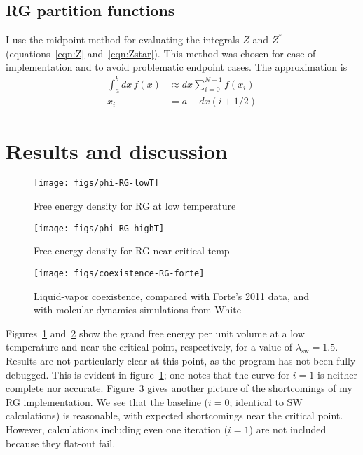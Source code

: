 \documentclass[letterpaper,twocolumn,amsmath,amssymb,prb]{revtex4-1}
\newcommand{\lambdaSW}{\ensuremath{\lambda_\text{sw}}}
\begin{document}
\subsection{RG partition functions}\label{subsec:fbar-ubar}
I use the midpoint method for evaluating the integrals $Z$ and $Z^*$
(equations~\ref{eqn:Z} and~\ref{eqn:Zstar}). This method was chosen
for ease of implementation and to avoid problematic endpoint
cases. The approximation is
\begin{align}
  \int_a^b dx\, f(x) &\approx dx\sum_{i=0}^{N-1} f(x_i) \\
  x_i &= a + dx(i+1/2)
\end{align}

\section{Results and discussion}\label{sec:results}

\begin{figure}
  \begin{center}
  \texttt{[image: figs/phi-RG-lowT]}
  \end{center}
  \caption{Free energy density for RG at low temperature}
  \label{fig:phi-RG-lowT}
\end{figure}

\begin{figure}
  \begin{center}
  \texttt{[image: figs/phi-RG-highT]}
  \end{center}
  \caption{Free energy density for RG near critical temp}
  \label{fig:phi-RG-highT}
\end{figure}

\begin{figure}
  \begin{center}
  \texttt{[image: figs/coexistence-RG-forte]}
  \end{center}
  \caption{Liquid-vapor coexistence, compared with Forte's 2011 data, and with molcular dynamics simulations from White\cite{White00}}
  \label{fig:coexistence-RG-forte}
\end{figure}

Figures~\ref{fig:phi-RG-lowT} and~\ref{fig:phi-RG-highT} show the
grand free energy per unit volume at a low temperature and near the
critical point, respectively, for a value of $\lambdaSW = 1.5$. Results are not particularly clear at
this point, as the program has not been fully debugged. This is
evident in figure~\ref{fig:phi-RG-lowT}; one notes that the curve for
$i=1$ is neither complete nor
accurate. Figure~\ref{fig:coexistence-RG-forte} gives another
picture of the shortcomings of my RG implementation. We see that the
baseline ($i=0$; identical to SW calculations) is reasonable, with
expected shortcomings near the critical point. However, calculations
including even one iteration ($i=1$) are not included because they flat-out fail.
\end{document}
